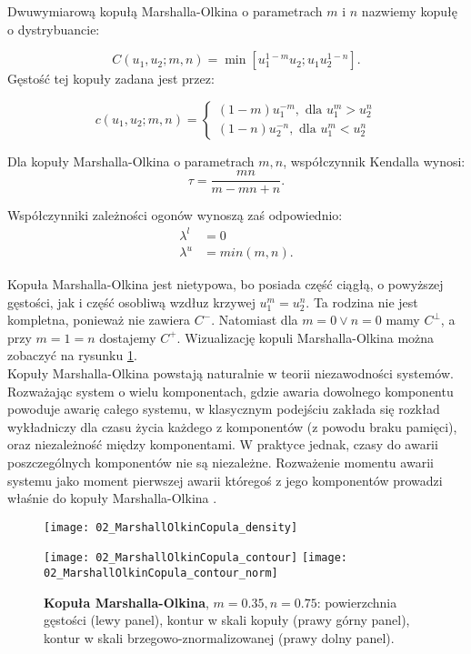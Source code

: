 \begin{df}
	Dwuwymiarową kopułą Marshalla-Olkina o parametrach $m$ i $n$ nazwiemy kopułę o dystrybuancie:
	
	$$ C(u_1, u_2; m,n) = \min[u_1^{1-m}u_2; u_1u_2^{1-n}].$$
	Gęstość tej kopuły zadana jest przez:
	
	$$
	c(u_1, u_2;m,n)=
	\begin{cases}
		(1-m)u_1^{-m},\text{ dla }u_1^m>u_2^n\\
		(1-n)u_2^{-n},\text{ dla }u_1^m<u_2^n
	\end{cases}
	$$	
\end{df}
\begin{prop}
	Dla kopuły Marshalla-Olkina o parametrach $m,n$, współczynnik Kendalla wynosi:
	$$ \tau = \frac{mn}{m-mn+n}.$$
	
	Współczynniki zależności ogonów wynoszą zaś odpowiednio:
	\begin{equation}
		\begin{split}
			\lambda^{l}&=0\\
			\lambda^{u}&=min(m,n).
		\end{split}
	\end{equation}
\end{prop}
Kopuła Marshalla-Olkina jest nietypowa, bo posiada część ciągłą, o powyższej gęstości, jak i część osobliwą wzdłuz krzywej $u_1^m=u_2^n$. Ta rodzina nie jest kompletna, ponieważ nie zawiera $C^{-}$. Natomiast dla $m=0 \vee n=0$ mamy $C^{\perp}$, a przy $m=1=n$ dostajemy $C^{+}$. Wizualizację kopuli Marshalla-Olkina można zobaczyć na rysunku \ref{fig:marshall_olkin_copula_density}.\\
Kopuły Marshalla-Olkina powstają naturalnie w teorii niezawodności systemów. Rozważając system o wielu komponentach, gdzie awaria dowolnego komponentu powoduje awarię całego systemu, w klasycznym podejściu zakłada się rozkład wykładniczy dla czasu życia każdego z komponentów (z powodu braku pamięci), oraz niezależność między komponentami. W praktyce jednak, czasy do awarii poszczególnych komponentów nie są niezależne. Rozważenie momentu awarii systemu jako moment pierwszej awarii któregoś z jego komponentów prowadzi właśnie do kopuły Marshalla-Olkina \cite{Matus2019}.\\

\begin{figure}[h]
	\centering
	\begin{minipage}{0.5\linewidth}
		\texttt{[image: 02\_MarshallOlkinCopula\_density]}
	\end{minipage}
	\begin{minipage}{0.45\linewidth}
		\texttt{[image: 02\_MarshallOlkinCopula\_contour]}
		\texttt{[image: 02\_MarshallOlkinCopula\_contour\_norm]}
	\end{minipage}
	\caption{\textbf{Kopuła Marshalla-Olkina}, $m=0.35,n=0.75$: powierzchnia gęstości (lewy panel), kontur w skali kopuły (prawy górny panel), kontur w skali brzegowo-znormalizowanej (prawy dolny panel). \label{fig:marshall_olkin_copula_density}}
\end{figure}



